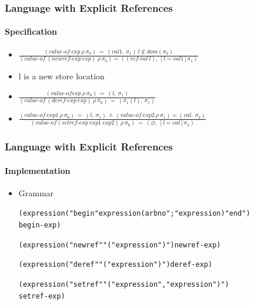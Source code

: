 \documentclass{beamer}
\begin{document}
\begin{frame}[fragile]
\frametitle{Language with Explicit References}
\framesubtitle{Specification}
\begin{scriptsize}
\begin{itemize}
\item<1-> $\frac{(value\text{-}of \ exp \ \rho \ \sigma_0) \ = \ (val1, \ \sigma_1)	\ l\notin dom(\sigma_0)
}{(value\text{-}of \ (newref\text{-}exp \ exp) \ \rho \ \sigma_0) =   ((ref\text{-}val \ l), \ \left[l =  val1\right]\sigma_1)}$

\item<1-> l is a new store location

\item<2-> $\frac{(value\text{-}of exp \ \rho \ \sigma_0) \ = \ (l, \ \sigma_1)}{(value\text{-}of \ (deref\text{-}exp \ exp) \ \rho \ \sigma_0) \ =  \ (\sigma_1(l), \ \sigma_1)}$

\item<3-> $\frac{(value\text{-}of \ exp1 \ \rho \ \sigma_0) \ = \ (l, \ \sigma_1) \ \wedge \ (value\text{-}of \ exp2 \ \rho \ \sigma_1) = (val, \ \sigma_2)}{(value\text{-}of (setref\text{-}exp \ exp1 \ exp2) \ \rho \ \sigma_0) \ = \ (\varnothing, \ \left[ l =  val\right] \sigma_2)}$

\end{itemize}
\end{scriptsize}
\end{frame}

\begin{frame}[fragile]
\frametitle{Language with Explicit References}
\framesubtitle{Implementation}
\begin{scriptsize}
\begin{itemize}
\item<1-> Grammar
\begin{alltt}
(expression ("begin" expression (arbno ";" expression) "end")
            begin-exp)

(expression ("newref" "(" expression ")") newref-exp)

(expression ("deref" "(" expression ")") deref-exp)

(expression ("setref" "(" expression "," expression ")")
            setref-exp)
\end{alltt}

\end{itemize}
\end{scriptsize}
\end{frame}
\end{document}
